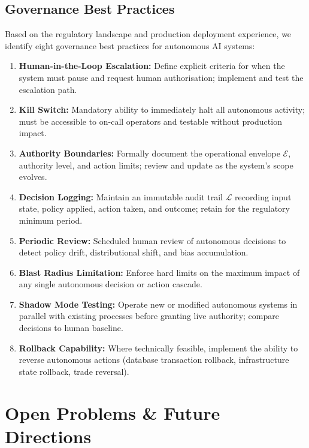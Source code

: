 \documentclass[12pt, a4paper]{article}
\begin{document}
\subsection{Governance Best Practices}
Based on the regulatory landscape and production deployment experience, we identify eight governance best practices for autonomous AI systems:

\begin{enumerate}
    \item \textbf{Human-in-the-Loop Escalation:} Define explicit criteria for when the system must pause and request human authorisation; implement and test the escalation path.
    \item \textbf{Kill Switch:} Mandatory ability to immediately halt all autonomous activity; must be accessible to on-call operators and testable without production impact.
    \item \textbf{Authority Boundaries:} Formally document the operational envelope $\mathcal{E}$, authority level, and action limits; review and update as the system's scope evolves.
    \item \textbf{Decision Logging:} Maintain an immutable audit trail $\mathcal{L}$ recording input state, policy applied, action taken, and outcome; retain for the regulatory minimum period.
    \item \textbf{Periodic Review:} Scheduled human review of autonomous decisions to detect policy drift, distributional shift, and bias accumulation.
    \item \textbf{Blast Radius Limitation:} Enforce hard limits on the maximum impact of any single autonomous decision or action cascade.
    \item \textbf{Shadow Mode Testing:} Operate new or modified autonomous systems in parallel with existing processes before granting live authority; compare decisions to human baseline.
    \item \textbf{Rollback Capability:} Where technically feasible, implement the ability to reverse autonomous actions (database transaction rollback, infrastructure state rollback, trade reversal).
\end{enumerate}

\section{Open Problems \& Future Directions}\label{sec:future}
\end{document}
